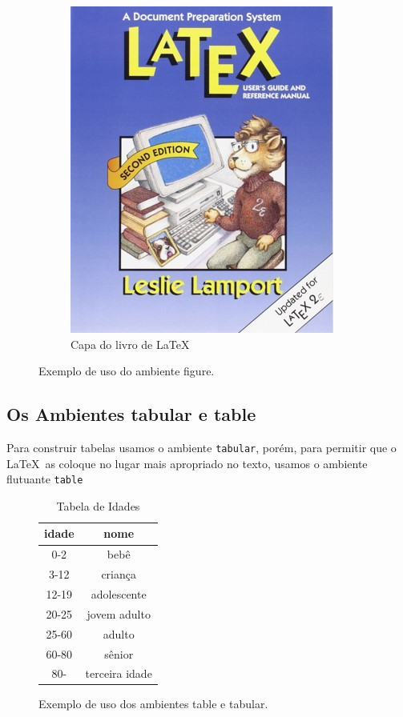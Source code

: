 \begin{figure}[hbt]
    \begin{LTXexample}[pos=b]
\begin{figure}
\centering
\includegraphics[height=0.3\textheight]{Images/Picture6}
\caption{Capa do livro de \LaTeX\ }
\label{fig:picture6}
\end{figure}
    \end{LTXexample}
    \caption{Exemplo de uso do ambiente figure.}
    \label{fig:fig}
\end{figure}

\subsection{Os Ambientes tabular e table}

Para construir tabelas usamos o ambiente \lstinline|tabular|, porém, para permitir que o \LaTeX\ as coloque no lugar mais apropriado no texto, usamos o ambiente flutuante \lstinline|table|

\begin{figure}[hbt]
    \begin{LTXexample}[pos=b]
    \begin{table}
    \caption{Tabela de Idades}
    \centering
    \label{tab:idades}
    \begin{tabular}{|c|c|}
    \hline
    \textbf{idade} & \textbf{nome} \\
    \hline
    0-2   & bebê \\
    3-12  & criança \\
    12-19 & adolescente \\
    20-25 & jovem adulto \\
    25-60 & adulto \\
    60-80 & sênior \\
    80-   & terceira idade \\
    \hline
    \end{tabular}
    \end{table}
    \end{LTXexample}
    \caption{Exemplo de uso dos ambientes table e tabular.}
\label{fig:tabtab}
\end{figure}

